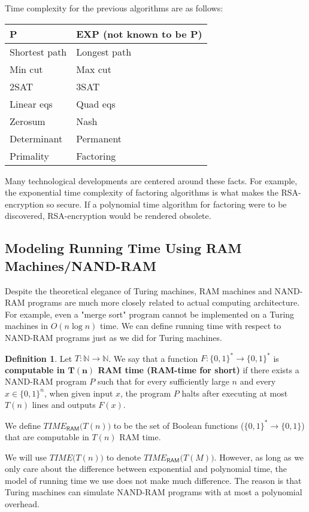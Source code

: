 \documentclass[a4paper, 12pt]{report}
\theoremstyle{remark}
\theoremstyle{definition}
\newtheorem{definition}{Definition}[section]
\begin{document}
Time complexity for the previous algorithms are as follows: 
\begin{center}
\begin{tabular}{l|l}
    \textbf{P} & \textbf{EXP} (not known to be \textbf{P}) \\
    \hline
    Shortest path & Longest path \\
    Min cut & Max cut \\
    2SAT & 3SAT \\
    Linear eqs & Quad eqs \\
    Zerosum & Nash \\
    Determinant & Permanent\\
    Primality & Factoring
\end{tabular}
\end{center}
Many technological developments are centered around these facts. For example, the exponential time complexity of factoring algorithms is what makes the RSA-encryption so secure. If a polynomial time algorithm for factoring were to be discovered, RSA-encryption would be rendered obsolete. 

\subsection{Modeling Running Time Using RAM Machines/NAND-RAM}
Despite the theoretical elegance of Turing machines, RAM machines and NAND-RAM programs are much more closely related to actual computing architecture. For example, even a "merge sort" program cannot be implemented on a Turing machines in $O(n \log n)$ time. We can define running time with respect to NAND-RAM programs just as we did for Turing machines. 

\begin{definition}
Let $T: \mathbb{N} \longrightarrow \mathbb{N}$. We say that a function $F: \{0,1\}^* \longrightarrow \{0,1\}^*$ is \textbf{computable in $\mathbf{T(n)}$ RAM time (RAM-time for short)} if there exists a NAND-RAM program $P$ such that for every sufficiently large $n$ and every $x \in \{0,1\}^n$, when given input $x$, the program $P$ halts after executing at most $T(n)$ lines and outputs $F(x)$. 

We define $TIME_{\mathsf{RAM}} \big(T(n)\big)$ to be the set of Boolean functions ($\{0,1\}^* \longrightarrow \{0,1\}$) that are computable in $T(n)$ RAM time. 
\end{definition}

We will use $TIME \big( T(n)\big)$ to denote $TIME_{\mathsf{RAM}} \big(T(M) \big)$. However, as long as we only care about the difference between exponential and polynomial time, the model of running time we use does not make much difference. The reason is that Turing machines can simulate NAND-RAM programs with at most a polynomial overhead. 
\end{document}
